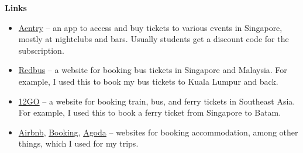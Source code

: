 \textbf{Links}
\begin{itemize}
    \item \href{https://aentry.app/events}{Aentry} -- an app to access and buy tickets to various events in Singapore, mostly at nightclubs and bars. Usually students get a discount code for the subscription.
    \item \href{https://www.redbus.sg}{Redbus} -- a website for booking bus tickets in Singapore and Malaysia. For example, I used this to book my bus tickets to Kuala Lumpur and back.
    \item \href{https://12go.asia/en}{12GO} -- a website for booking train, bus, and ferry tickets in Southeast Asia. For example, I used this to book a ferry ticket from Singapore to Batam.
    \item \href{https://www.airbnb.se}{Airbnb}, \href{https://www.booking.com}{Booking}, \href{https://www.agoda.com/sv-se/?ds=eGn8Sjtq6XiLUdOw}{Agoda} -- websites for booking accommodation, among other things, which I used for my trips.
\end{itemize}


